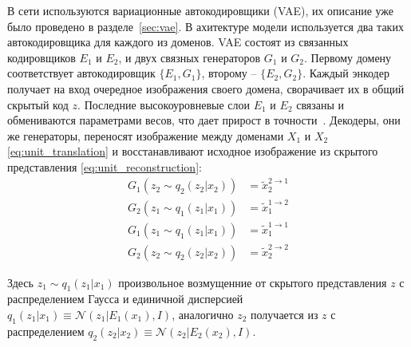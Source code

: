 \documentclass[11pt,a4paper]{extarticle}
\begin{document}
{			В сети используются вариационные автокодировщики (VAE), их описание уже было проведено в разделе~\ref{sec:vae}. В ахитектуре модели используется два таких автокодировщика для каждого из доменов.
			VAE состоят из связанных кодировщиков \(E_1\) и \(E_2\), и двух связных генераторов \(G_1\) и \(G_2\).
			Первому домену соответствует автокодировщик \(\{ E_1,G_1 \}\), второму -- \(\{ E_2,G_2 \}\).
			Каждый энкодер получает на вход очередное изображения своего домена, сворачивает их в общий скрытый код \(z\).
			Последние высокоуровневые слои \(E_1\) и \(E_2\) связаны и обмениваются параметрами весов, что дает прирост в точности~\cite{coGAN}.
			Декодеры, они же генераторы, переносят изображение между доменами \(X_1\) и \(X_2\) \eqref{eq:unit_translation} и восстанавливают исходное изображение из скрытого представления \eqref{eq:unit_reconstruction}:
			\begin{equation}\label{eq:unit_translation}
				\begin{aligned}
					G_1(z_2 \sim q_2(z_2|x_2)) &= \tilde{x}^{2 \rightarrow 1}_2 \\
					G_2(z_1 \sim q_1(z_1|x_1)) &= \tilde{x}^{1 \rightarrow 2}_1 
				\end{aligned}
			\end{equation}
			\begin{equation}\label{eq:unit_reconstruction}
				\begin{aligned}
					G_1(z_1 \sim q_1(z_1|x_1)) &= \tilde{x}^{1 \rightarrow 1}_1 \\
					G_2(z_2 \sim q_2(z_2|x_2)) &= \tilde{x}^{2 \rightarrow 2}_2
				\end{aligned}
			\end{equation}

			\noindent
			Здесь \(z_1 \sim q_1(z_1|x_1)\) произвольное возмущенние от скрытого представления \(z\) с распределением Гаусса и единичной дисперсией \(q_1(z_1|x_1) \equiv \mathcal{N}(z_1|E_1(x_1), I)\),
			аналогично \(z_2\) получается из \(z\) с распределением \(q_2(z_2|x_2) \equiv \mathcal{N}(z_2|E_2(x_2), I)\).

}
\end{document}
